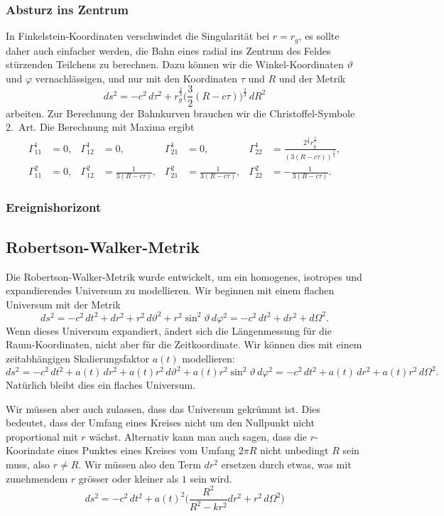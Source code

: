 \subsubsection{Absturz ins Zentrum}
In Finkelstein-Koordinaten verschwindet die Singularität bei $r=r_g$,
es sollte daher auch einfacher werden, die Bahn eines radial ins
Zentrum des Feldes stürzenden Teilchens zu berechnen.
Dazu können wir die Winkel-Koordinaten $\vartheta$ und $\varphi$
vernachlässigen, und nur mit den Koordinaten $\tau$ und $R$ und der
Metrik
\[
ds^2
=
-c^2 \,d\tau^2
+r_g^{\frac23}\biggl(\frac32(R-c\tau)\biggr)^{\frac23}\,dR^2
\]
arbeiten.
Zur Berechnung der Bahnkurven brauchen wir die Christoffel-Symbole
2.~Art.
Die Berechnung mit Maxima ergibt
\begin{align*}
\Gamma^1_{11} &= 0,&
\Gamma^1_{12} &= 0,&
\Gamma^1_{21} &= 0,&
\Gamma^1_{22} &= \frac{2^{\frac23}r_g^{\frac23}}{(3(R-c\tau))^{\frac53}},\\
\Gamma^2_{11} &= 0,&
\Gamma^2_{12} &= \frac1{3(R-c\tau)},&
\Gamma^2_{21} &= \frac1{3(R-c\tau)},&
\Gamma^2_{22} &= -\frac1{3(R-c\tau)}.
\end{align*}

\subsubsection{Ereignishorizont}

\subsection{Robertson-Walker-Metrik}
Die Robertson-Walker-Metrik wurde entwickelt, um ein homogenes,
isotropes und expandierendes Universum zu modellieren.
Wir beginnen mit einem flachen Universum mit der
Metrik
\[
ds^2
=
-c^2\,dt^2 + dr^2 + r^2\,d\vartheta^2 + r^2\sin^2\vartheta \,d\varphi^2
=
-c^2\,dt^2 + dr^2 + d\Omega^2.
\]
Wenn dieses Universum expandiert, ändert sich die Längenmessung für die
Raum-Koordinaten, nicht aber für die Zeitkoordinate.
Wir können dies mit einem zeitabhängigen Skalierungsfaktor $a(t)$ 
modellieren:
\[
ds^2
=
-c^2\,dt^2 + a(t)\,dr^2 + a(t)r^2\,d\vartheta^2 + a(t)r^2 \sin^2\vartheta\,d\varphi^2
=
-c^2\,dt^2 + a(t)\,dr^2 + a(t)r^2\,d\Omega^2.
\]
Natürlich bleibt dies ein flaches Universum.

Wir müssen aber auch zulassen, dass das Universum gekrümmt ist.
Dies bedeutet, dass der Umfang eines Kreises nicht um den Nullpunkt
nicht proportional mit $r$ wächst.
Alternativ kann man auch sagen, dass die $r$-Koorindate eines Punktes 
eines Kreises vom Umfang $2\pi R$ nicht unbedingt $R$ sein muss, also
$r \ne R$.
Wir müssen also den Term $dr^2$ ersetzen durch etwas, was mit zunehmendem
$r$ grösser oder kleiner als $1$ sein wird.
\[
ds^2
=
-c^2\,dt^2
+ a(t)^2 \biggl(
\frac{R^2}{R^2-kr^2} dr^2
+
r^2\, d\Omega^2
\biggr)
\]

